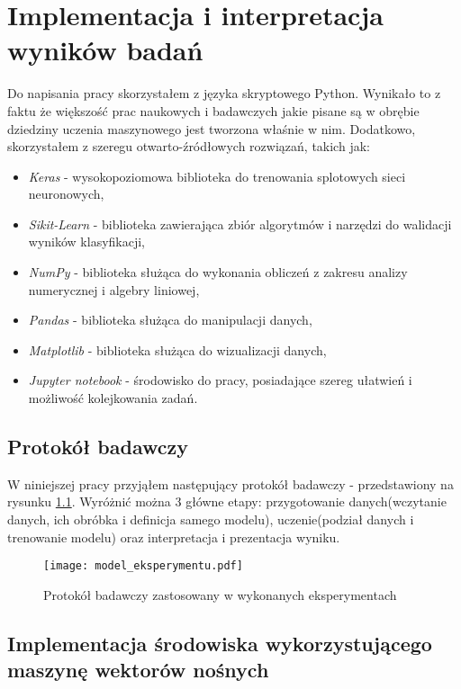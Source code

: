 \chapter{Implementacja i interpretacja wyników badań}

Do napisania pracy skorzystałem z języka skryptowego Python. Wynikało to z faktu że większość prac naukowych i badawczych jakie pisane są w obrębie dziedziny uczenia maszynowego jest tworzona właśnie w nim. Dodatkowo, skorzystałem z szeregu otwarto-źródłowych rozwiązań, takich jak:
\begin{itemize}
	\item \textit{Keras}\cite{keras} - wysokopoziomowa biblioteka do trenowania splotowych sieci neuronowych,
	\item \textit{Sikit-Learn} \cite{scikit} - biblioteka zawierająca zbiór algorytmów i narzędzi do walidacji wyników klasyfikacji,
	\item \textit{NumPy}  \cite{numpy} - biblioteka służąca do wykonania obliczeń z zakresu analizy numerycznej i algebry liniowej,
	\item \textit{Pandas}  \cite{pandas} - biblioteka służąca do manipulacji danych,
	\item \textit{Matplotlib}  \cite{matplotlib} - biblioteka służąca do wizualizacji danych,
	\item \textit{Jupyter notebook}  \cite{jupyter} - środowisko do pracy, posiadające szereg ułatwień i możliwość kolejkowania zadań.
\end{itemize}

\section{Protokół badawczy}

W niniejszej pracy przyjąłem następujący protokół badawczy - przedstawiony na rysunku \ref{fig:model_eks}. Wyróżnić można 3 główne etapy: przygotowanie danych(wczytanie danych, ich obróbka i definicja samego modelu), uczenie(podział danych i trenowanie modelu) oraz interpretacja i prezentacja wyniku.

\begin{figure}[h!]
	\texttt{[image: model\_eksperymentu.pdf]}
	\centering
	\caption{Protokół badawczy zastosowany w wykonanych eksperymentach}
	\label{fig:model_eks}
\end{figure}

\section{Implementacja środowiska  wykorzystującego maszynę wektorów nośnych}

